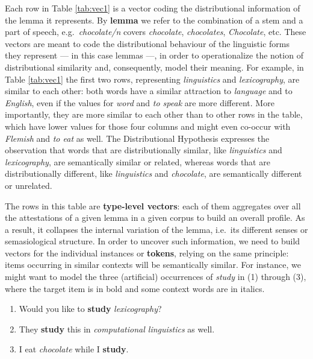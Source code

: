 \documentclass[
]{book}
\providecommand{\tightlist}{%
  \setlength{\itemsep}{0pt}\setlength{\parskip}{0pt}}
\begin{document}
Each row in Table \ref{tab:vec1} is a vector coding the distributional information of the lemma it represents. By \textbf{lemma} we refer to the combination of a stem and a part of speech, e.g.~\emph{chocolate/n} covers \emph{chocolate}, \emph{chocolates}, \emph{Chocolate}, etc.
These vectors are meant to code the distributional behaviour of the linguistic forms they represent --- in this case lemmas ---, in order to operationalize the notion of distributional similarity and, consequently, model their meaning. For example, in Table \ref{tab:vec1} the first two rows, representing \emph{linguistics} and \emph{lexicography}, are similar to each other: both words have a similar attraction to \emph{language} and to \emph{English}, even if the values for \emph{word} and \emph{to speak} are more different. More importantly, they are more similar to each other than to other rows in the table, which have lower values for those four columns and might even co-occur with \emph{Flemish} and \emph{to eat} as well.
The Distributional Hypothesis expresses the observation that words that are distributionally similar, like \emph{linguistics} and \emph{lexicography}, are semantically similar or related, whereas words that are distributionally different, like \emph{linguistics} and \emph{chocolate}, are semantically different or unrelated.

The rows in this table are \textbf{type-level vectors}: each of them aggregates over all the attestations of a given lemma in a given corpus to build an overall profile. As a result, it collapses the internal variation of the lemma, i.e.~its different senses or semasiological structure. In order to uncover such information, we need to build vectors for the individual instances or \textbf{tokens}, relying on the same principle: items occurring in similar contexts will be semantically similar. For instance, we might want to model the three (artificial) occurrences of \emph{study} in (1) through (3), where the target item is in bold and some context words are in italics.

\begin{enumerate}
\def\labelenumi{(\arabic{enumi})}
\tightlist
\item
  Would you like to \textbf{study} \emph{lexicography}?
\item
  They \textbf{study} this in \emph{computational linguistics} as well.
\item
  I eat \emph{chocolate} while I \textbf{study}.
\end{enumerate}
\end{document}
